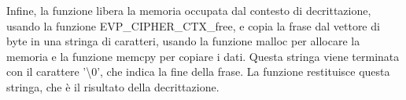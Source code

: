 Infine, la funzione libera la memoria occupata dal contesto di decrittazione, usando la funzione EVP\_CIPHER\_CTX\_free, e copia la frase dal vettore di byte in una stringa di caratteri, usando la funzione malloc per allocare la memoria e la funzione memcpy per copiare i dati. Questa stringa viene terminata con il carattere '\textbackslash 0', che indica la fine della frase. La funzione restituisce questa stringa, che è il risultato della decrittazione.